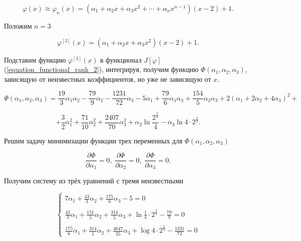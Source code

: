 \documentclass{article}
\begin{document}
\begin{displaymath}
	\varphi(x) \approx \varphi_{n}(x) = (\alpha_{1} + \alpha_{2}x + \alpha_{3}x^2 + \cdots + \alpha_{n}x^{n-1})(x-2)+1.
\end{displaymath}

\noindent Положим $n = 3$

\begin{displaymath}
	\varphi^{[3]}(x) = (\alpha_{1} + \alpha_{2}x + \alpha_{3}x^2)(x-2)+1.
\end{displaymath}

\noindent Подставим функцию $\varphi^{[3]}(x)$ в функционал $J[\varphi]$ (\ref{equation_functional_rank_2}), интегрируя, получим функцию $\Phi(\alpha_{1}, \alpha_{2}, \alpha_{3})$, зависящую от неизвестных коэффициентов, но уже не зависящую от $x$.

\begin{displaymath}
	\Phi(\alpha_{1}, \alpha_{2}, \alpha_{3}) = \frac{19}{3}\alpha_{1}\alpha_{2} - \frac{79}{9}\alpha_{2} - \frac{1231}{72}\alpha_{3} - 5\alpha_{1} + \frac{79}{6}\alpha_{1}\alpha_{3} + \frac{154}{5}\alpha_{2}\alpha_{3} + 2(\alpha_{1} + 2 \alpha_{2} + 4\alpha_{3})^2 +
\end{displaymath}
	
\begin{displaymath}	
	 + \frac{3}{2}\alpha_{1}^{2} +  \frac{71}{10}\alpha_{2}^{2} + \frac{2407}{70}\alpha_{3}^{2} + \alpha_{2} \ln{\frac{2^{\frac{2}{3}}}{4}} - \alpha_{3} \ln{4 \cdot 2^{\frac{2}{3}}}.
\end{displaymath}

\noindent Решим задачу минимизации функции трех переменных для $\Phi(\alpha_{1}, \alpha_{2}, \alpha_{3})$

\begin{displaymath}
	\frac{\partial \Phi}{\partial \alpha_{1}} = 0, \;
	\frac{\partial \Phi}{\partial \alpha_{2}} = 0, \;
	\frac{\partial \Phi}{\partial \alpha_{3}} = 0.
\end{displaymath}

\noindent Получим систему из трёх уравнений с тремя неизвестными

\begin{displaymath}
	\begin{cases}
		7\alpha_{1} + \frac{43}{3}\alpha_{2} + \frac{175}{6}\alpha_{3} - 5 = 0 \\
		\\
		\frac{43}{3}\alpha_{1} + \frac{151}{5}\alpha_{2} + \frac{314}{5}\alpha_{3} + \ln{\frac{1}{4} \cdot 2^{\frac{2}{3}}} - \frac{79}{9} = 0 \\
		\\
		\frac{175}{6}\alpha_{1} + \frac{314}{5}\alpha_{2} + \frac{4647}{35}\alpha_{3} + \log{4 \cdot 2^{\frac{2}{3}}} - \frac{1231}{72} = 0
	\end{cases}
\end{displaymath}
\end{document}
